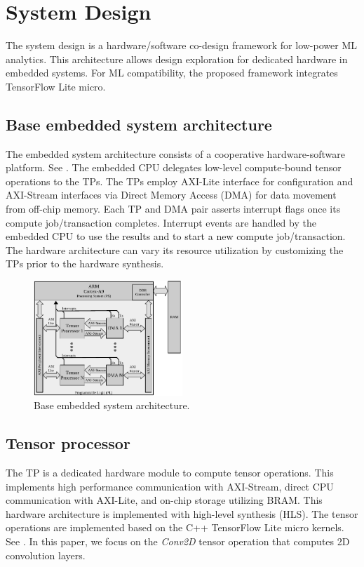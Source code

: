 \section{System Design}
\label{sec:system_design}
The system design is a hardware/software co-design framework for low-power ML analytics. This architecture allows design exploration for dedicated hardware in embedded systems. For ML compatibility, the proposed framework integrates TensorFlow Lite micro.

\subsection{Base embedded system architecture}
The embedded system architecture consists of a cooperative hardware-software platform. See . The embedded CPU delegates low-level compute-bound tensor operations to the TPs. The TPs employ AXI-Lite interface for configuration and AXI-Stream interfaces via Direct Memory Access (DMA) for data movement from off-chip memory. Each TP and DMA pair asserts interrupt flags once its compute job/transaction completes. Interrupt events are handled by the embedded CPU to use the results and to start a new compute job/transaction. The hardware architecture can vary its resource utilization by customizing the TPs prior to the hardware synthesis.
\begin{figure}[t!]
	\centering
	\includegraphics[width=0.5\textwidth]{./chapters/cnn_accelerator/figures/system_design.pdf}
	\caption{Base embedded system architecture.}
	\label{fig:system_architecture}
\end{figure}
\subsection{Tensor processor}
The TP is a dedicated hardware module to compute tensor operations. This implements high performance communication with AXI-Stream, direct CPU communication with AXI-Lite, and on-chip storage utilizing BRAM. This hardware architecture is implemented with high-level synthesis (HLS). The tensor operations are implemented based on the C++ TensorFlow Lite micro kernels. See . In this paper, we focus on the \emph{Conv2D} tensor operation that computes 2D convolution layers.

